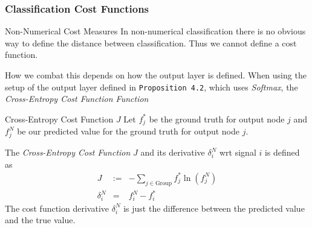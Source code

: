 \documentclass[11pt,a4paper]{article}
\begin{document}
\subsubsection{Classification Cost Functions} \label{sec_ClassificationCostFunctions}

  \begin{remark}{Non-Numerical Cost Measures}
    In non-numerical classification there is no obvious way to define the distance between classification. Thus we cannot define a cost function.
    \par How we combat this depends on how the output layer is defined. When using the setup of the output layer defined in \texttt{Proposition 4.2}, which uses \textit{Softmax}, the \textit{Cross-Entropy Cost Function Function}
  \end{remark}

  \begin{definition}{Cross-Entropy Cost Function $J$}
    Let $f_j^*$ be the ground truth for output node $j$ and $f_j^N$ be our predicted value for the ground truth for output node $j$.
    \par The \textit{Cross-Entropy Cost Function} $J$ and its derivative $\delta_i^N$ wrt signal $i$ is defined as
    \[\begin{array}{rrl}
    J&:=&-\displaystyle\sum_{j\in\text{Group}}f_j^*\ln(f_j^N)\\
    \delta_i^N&=&f_i^N-f_i^*
    \end{array}\]
    The cost function derivative $\delta_i^N$ is just the difference between the predicted value and the true value.
  \end{definition}
\end{document}
